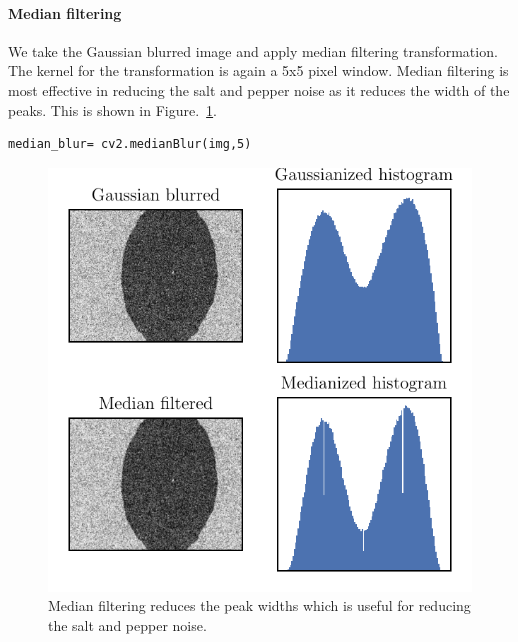 \documentclass[12pt, twoside, a4paper]{article}
\begin{document}
\paragraph{Median filtering}
We take the Gaussian blurred image and apply median filtering transformation. The kernel for the transformation is again a 5x5 pixel window. Median filtering is most effective in reducing the salt and pepper noise as it reduces the width of the peaks. This is shown in Figure.~\ref{openCV median filtering}.
%
\begin{verbatim}
median_blur= cv2.medianBlur(img,5)
\end{verbatim}
%
%
\begin{figure}[!htbp]
	\centering
	\includegraphics[scale=1.0]{figures/03_MedianFilteredEffect.pdf}
	\caption{Median filtering reduces the peak widths which is useful for reducing the salt and pepper noise.
	}
	\label{openCV median filtering}
\end{figure}
%
\end{document}

